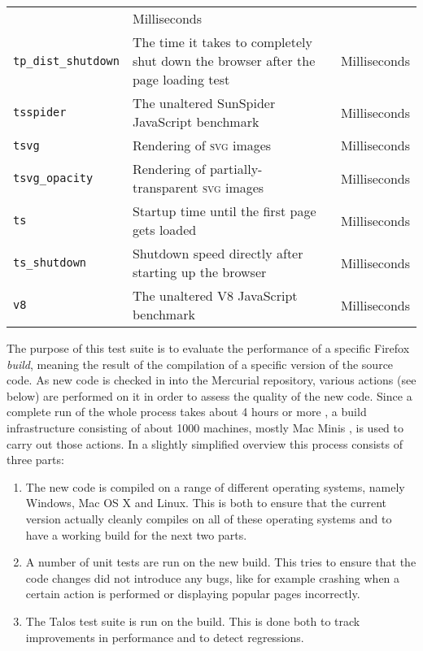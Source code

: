 \begin{table}[tbp]
\begin{tabular}{l >{\RaggedRight}p{7cm} l}
            & Milliseconds \\
        \texttt{tp\_dist\_shutdown}
            & The time it takes to completely shut down the browser after the
              page loading test
            & Milliseconds \\
        \texttt{tsspider}
            & The unaltered SunSpider JavaScript benchmark
            & Milliseconds \\
        \texttt{tsvg}
            & Rendering of \textsc{svg} images
            & Milliseconds \\
        \texttt{tsvg\_opacity}
            & Rendering of partially-transparent \textsc{svg} images
            & Milliseconds \\
        \texttt{ts}
            & Startup time until the first page gets loaded
            & Milliseconds \\
        \texttt{ts\_shutdown}
            & Shutdown speed directly after starting up the browser
            & Milliseconds \\
        \texttt{v8}
            & The unaltered V8 JavaScript benchmark
            & Milliseconds \\
        \bottomrule
    \end{tabular}
\end{table}

The purpose of this test suite is to evaluate the performance of a specific
Firefox \emph{build}, meaning the result of the compilation of a specific
version of the source code. As new code is checked in into the Mercurial
repository, various actions (see below) are performed on it in order to assess
the quality of the new code. Since a complete run of the whole process takes
about 4 hours or more \citep{stoica_mozillas_2010}, a build infrastructure
consisting of about 1000 machines, mostly Mac Minis
\citep{gasparnian_release_2010}, is used to carry out those actions. In a
slightly simplified overview this process consists of three parts:

\begin{enumerate}
    \item The new code is compiled on a range of different operating systems,
        namely Windows, Mac OS X and Linux. This is both to ensure that the
        current version actually cleanly compiles on all of these operating
        systems and to have a working build for the next two parts.
    \item A number of unit tests are run on the new build. This tries to
        ensure that the code changes did not introduce any bugs, like for
        example crashing when a certain action is performed or displaying
        popular pages incorrectly.
    \item The Talos test suite is run on the build. This is done both to track
        improvements in performance and to detect regressions.
\end{enumerate}

